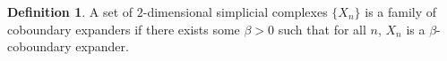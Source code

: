 \documentclass[10pt,a4paper]{article}
\theoremstyle{definition}
\newtheorem{definition}[theorem]{Definition}
\theoremstyle{remark}
\newtheorem{remark}[theorem]{Remark}
\newcommand{\Authornotecolored}[3]{{\sffamily\small\color{#1}{[#2: #3]}}}
\newcommand{\Authornotecolored}[3]{}
\newcommand{\Ynote}{\Authornotecolored{Purple}{Y}}
\newcommand\sett[2]{\left\{ #1 \left| \; \vphantom{#1 #2} \right. #2  \right\}}
\newcommand{\F}{\mathbb{F}}
\newcommand{\Psymb}{\mathbb{P}}
\DeclareMathOperator*{\ProbOp}{\Psymb}
\renewcommand{\Pr}{\ProbOp}
\renewcommand{\ge}{\geqslant}
\numberwithin{equation}{section}
\begin{document}
\begin{definition}
    A set of $2$-dimensional simplicial complexes $\{X_n\}$ is a family of coboundary expanders if there exists some $\beta >0$ such that for all $n$, $X_n$ is a $\beta$-coboundary expander. 
\end{definition}
     

\end{document}
